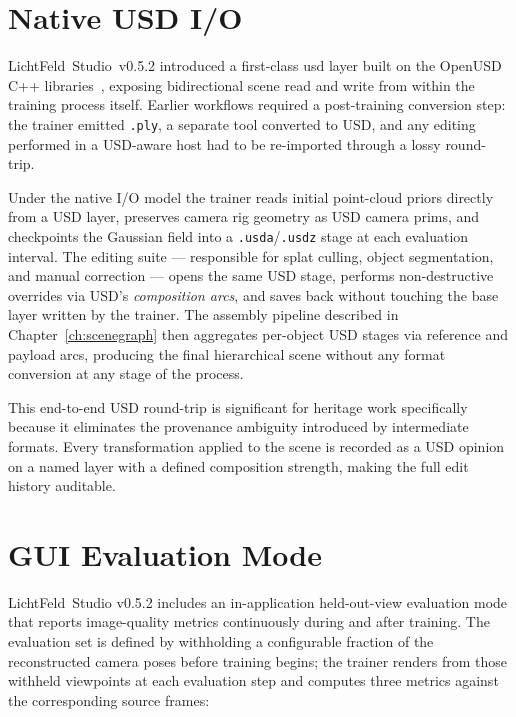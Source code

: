 \section{Native USD I/O}
\label{sec:lf-usd}

LichtFeld~Studio~v0.5.2 introduced a first-class \acrshort{usd} layer built on the
OpenUSD C++ libraries~\parencite{Pixar2019}, exposing bidirectional scene
read and write from within the training process itself.
Earlier workflows required a post-training conversion step: the trainer emitted \texttt{.ply},
a separate tool converted to USD, and any editing performed in a USD-aware host had to be
re-imported through a lossy round-trip.

Under the native I/O model the trainer reads initial point-cloud priors directly from a USD layer,
preserves camera rig geometry as USD camera prims, and checkpoints the Gaussian field into a
\texttt{.usda}/\texttt{.usdz} stage at each evaluation interval.
The editing suite — responsible for splat culling, object segmentation, and manual correction —
opens the same USD stage, performs non-destructive overrides via USD's \emph{composition arcs},
and saves back without touching the base layer written by the trainer.
The assembly pipeline described in Chapter~\ref{ch:scenegraph} then aggregates per-object
USD stages via reference and payload arcs, producing the final hierarchical scene without any
format conversion at any stage of the process.

This end-to-end USD round-trip is significant for heritage work specifically because it eliminates
the provenance ambiguity introduced by intermediate formats.
Every transformation applied to the scene is recorded as a USD opinion on a named layer with a
defined composition strength, making the full edit history auditable.

\section{GUI Evaluation Mode}
\label{sec:lf-eval}

LichtFeld~Studio v0.5.2 includes an in-application held-out-view evaluation mode that reports
image-quality metrics continuously during and after training.
The evaluation set is defined by withholding a configurable fraction of the reconstructed camera
poses before training begins; the trainer renders from those withheld viewpoints at each evaluation
step and computes three metrics against the corresponding source frames:

